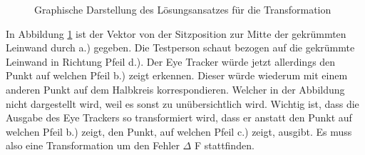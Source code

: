 \begin{figure}
\begin{center}
\caption{Graphische Darstellung des Lösungsansatzes für die Transformation} \label{fig:kruemmungsproblem_4}
\end{center}
\end{figure}

In Abbildung \ref{fig:kruemmungsproblem_4} ist der Vektor von der Sitzposition zur Mitte der gekrümmten Leinwand durch a.) gegeben. Die Testperson schaut bezogen auf die gekrümmte Leinwand in Richtung Pfeil d.). Der Eye Tracker würde jetzt allerdings den Punkt auf welchen Pfeil b.) zeigt erkennen. Dieser würde wiederum mit einem anderen Punkt auf dem Halbkreis korrespondieren. Welcher in der Abbildung nicht dargestellt wird, weil es sonst zu unübersichtlich wird. Wichtig ist, dass die Ausgabe des Eye Trackers so transformiert wird, dass er anstatt den Punkt auf welchen Pfeil b.) zeigt, den Punkt, auf welchen Pfeil c.) zeigt, ausgibt. Es muss also eine Transformation um den Fehler $\Delta$ F stattfinden.


